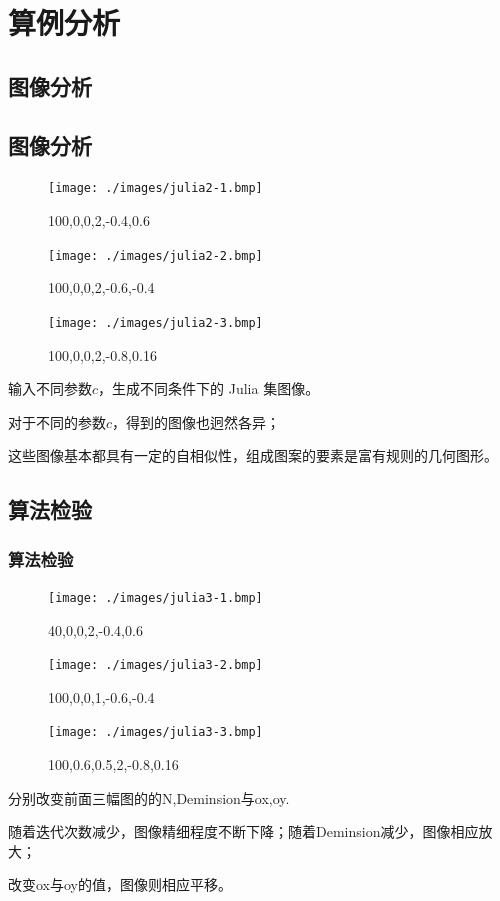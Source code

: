 \documentclass[8pt,c,compress,UTF8]{ctexbeamer}
\begin{document}
\section{算例分析}
\subsection{图像分析}
\begin{frame} 
\subsection{图像分析}
\begin{figure}[htbp]
\centering
\begin{minipage}{0.33\linewidth}
\centering
\texttt{[image: ./images/julia2-1.bmp]}
\caption*{100,0,0,2,-0.4,0.6}
\label{fig2-1}
\end{minipage}\hfill
\begin{minipage}{0.33\linewidth}
\centering
\texttt{[image: ./images/julia2-2.bmp]}
\caption*{100,0,0,2,-0.6,-0.4}
\label{fig2-2}
\end{minipage}\hfill
\begin{minipage}{0.33\linewidth}
\centering
\texttt{[image: ./images/julia2-3.bmp]}
\caption*{100,0,0,2,-0.8,0.16}
\label{fig2-3}
\end{minipage}
\end{figure}
输入不同参数$c$，生成不同条件下的 Julia 集图像。

对于不同的参数$c$，得到的图像也迥然各异；

这些图像基本都具有一定的自相似性，组成图案的要素是富有规则的几何图形。
\end{frame}

\subsection{算法检验}
\begin{frame} 
\frametitle{算法检验}

\begin{figure}[htbp]
\centering
\begin{minipage}{0.33\linewidth}
\centering
\texttt{[image: ./images/julia3-1.bmp]}
\caption*{40,0,0,2,-0.4,0.6}
\label{fig3-1}
\end{minipage}\hfill
\begin{minipage}{0.33\linewidth}
\centering
\texttt{[image: ./images/julia3-2.bmp]}
\caption*{100,0,0,1,-0.6,-0.4}
\label{fig3-2}
\end{minipage}\hfill
\begin{minipage}{0.33\linewidth}
\centering
\texttt{[image: ./images/julia3-3.bmp]}
\caption*{100,0.6,0.5,2,-0.8,0.16}
\label{fig3-3}
\end{minipage}
\end{figure}
分别改变前面三幅图的的N,Deminsion与ox,oy.

随着迭代次数减少，图像精细程度不断下降；随着Deminsion减少，图像相应放大；

改变ox与oy的值，图像则相应平移。
\end{frame}
\end{document}
